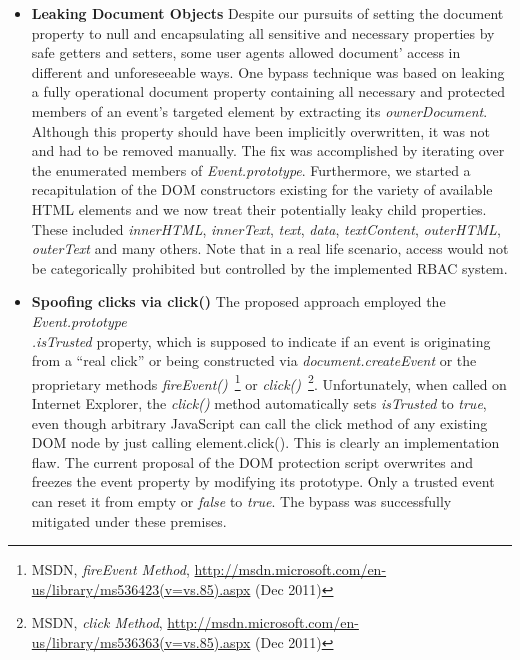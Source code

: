       \begin{itemize}
	\item \textbf{Leaking Document Objects} Despite our pursuits of setting the document property to null and encapsulating all sensitive and necessary properties by safe getters and setters, some user agents allowed document' access in different and unforeseeable ways. One bypass technique was based on leaking a fully operational document property containing all necessary and protected members of an event's targeted element by extracting its \textit{ownerDocument}. Although this property should have been implicitly overwritten, it was not and had to be removed manually. The fix was accomplished by iterating over the enumerated members of \textit{Event.prototype}. Furthermore, we started a recapitulation of the DOM constructors existing for the variety of available HTML elements and we now treat their potentially leaky child properties. These included \textit{innerHTML}, \textit{innerText}, \textit{text}, \textit{data}, \textit{textContent}, \textit{outerHTML}, \textit{outerText} and many others. Note that in a real life scenario, access would not be categorically prohibited but controlled by the implemented RBAC system.
	\item \textbf{Spoofing clicks via click()} The proposed approach employed the \textit{Event.prototype\\
.isTrusted} property, which is supposed to indicate if an event is originating from a ``real click'' or being constructed via \textit{document.createEvent} or the proprietary methods \textit{fireEvent()}~\footnote{MSDN, \textit{fireEvent Method}, \url{http://msdn.microsoft.com/en-us/library/ms536423(v=vs.85).aspx} (Dec 2011)} or \textit{click()}~\footnote{MSDN, \textit{click Method}, \url{http://msdn.microsoft.com/en-us/library/ms536363(v=vs.85).aspx} (Dec 2011)}. Unfortunately, when called on Internet Explorer, the \textit{click()} method automatically sets \textit{isTrusted} to \textit{true}, even though arbitrary JavaScript can call the click method of any existing DOM node by just calling element.click(). This is clearly an implementation flaw. The current proposal of the DOM protection script overwrites and freezes the event property by modifying its prototype. Only a trusted event can reset it from empty or \textit{false} to \textit{true}. The bypass was successfully mitigated under these premises.

\end{itemize}
